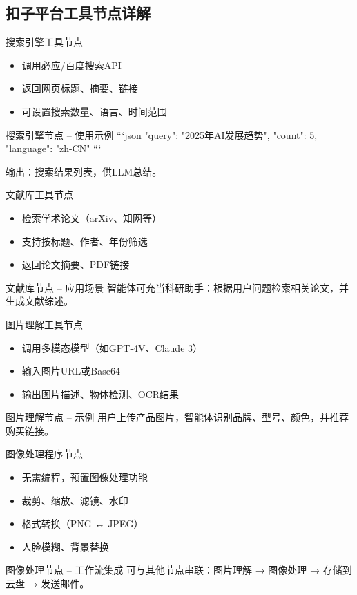 \subsection{扣子平台工具节点详解}

\begin{frame}{搜索引擎工具节点}
\begin{itemize}
    \item 调用必应/百度搜索API
    \item 返回网页标题、摘要、链接
    \item 可设置搜索数量、语言、时间范围
\end{itemize}
\end{frame}
\begin{frame}{搜索引擎节点 – 使用示例}
```json
{
  "query": "2025年AI发展趋势",
  "count": 5,
  "language": "zh-CN"
}
```

输出：搜索结果列表，供LLM总结。
\end{frame}

\begin{frame}{文献库工具节点}
\begin{itemize}
\item 检索学术论文（arXiv、知网等）
\item 支持按标题、作者、年份筛选
\item 返回论文摘要、PDF链接
\end{itemize}
\end{frame}
\begin{frame}{文献库节点 – 应用场景}
智能体可充当科研助手：根据用户问题检索相关论文，并生成文献综述。
\end{frame}

\begin{frame}{图片理解工具节点}
\begin{itemize}
\item 调用多模态模型（如GPT-4V、Claude 3）
\item 输入图片URL或Base64
\item 输出图片描述、物体检测、OCR结果
\end{itemize}
\end{frame}
\begin{frame}{图片理解节点 – 示例}
用户上传产品图片，智能体识别品牌、型号、颜色，并推荐购买链接。
\end{frame}

\begin{frame}{图像处理程序节点}
\begin{itemize}
\item 无需编程，预置图像处理功能
\item 裁剪、缩放、滤镜、水印
\item 格式转换（PNG ↔ JPEG）
\item 人脸模糊、背景替换
\end{itemize}
\end{frame}
\begin{frame}{图像处理节点 – 工作流集成}
可与其他节点串联：图片理解 → 图像处理 → 存储到云盘 → 发送邮件。
\end{frame}


